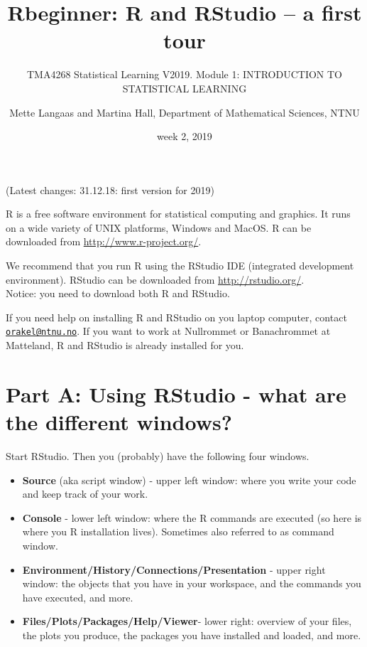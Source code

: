 \documentclass[]{article}
\title{Rbeginner: R and RStudio -- a first tour}
\subtitle{TMA4268 Statistical Learning V2019. Module 1: INTRODUCTION TO
STATISTICAL LEARNING}
\author{Mette Langaas and Martina Hall, Department of Mathematical Sciences,
NTNU}
\date{week 2, 2019}
\providecommand{\tightlist}{%
  \setlength{\itemsep}{0pt}\setlength{\parskip}{0pt}}
\begin{document}
\maketitle

{
\setcounter{tocdepth}{2}
\tableofcontents
}
(Latest changes: 31.12.18: first version for 2019)

R is a free software environment for statistical computing and graphics.
It runs on a wide variety of UNIX platforms, Windows and MacOS. R can be
downloaded from \url{http://www.r-project.org/}.

We recommend that you run R using the RStudio IDE (integrated
development environment). RStudio can be downloaded from
\url{http://rstudio.org/}.\\
Notice: you need to download both R and RStudio.

If you need help on installing R and RStudio on you laptop computer,
contact \href{mailto:orakel@ntnu.no}{\nolinkurl{orakel@ntnu.no}}. If you
want to work at Nullrommet or Banachrommet at Matteland, R and RStudio
is already installed for you.

\section{Part A: Using RStudio - what are the different
windows?}\label{part-a-using-rstudio---what-are-the-different-windows}

Start RStudio. Then you (probably) have the following four windows.

\begin{itemize}
\tightlist
\item
  \textbf{Source} (aka script window) - upper left window: where you
  write your code and keep track of your work.
\item
  \textbf{Console} - lower left window: where the R commands are
  executed (so here is where you R installation lives). Sometimes also
  referred to as command window.\\
\item
  \textbf{Environment/History/Connections/Presentation} - upper right
  window: the objects that you have in your workspace, and the commands
  you have executed, and more.\\
\item
  \textbf{Files/Plots/Packages/Help/Viewer}- lower right: overview of
  your files, the plots you produce, the packages you have installed and
  loaded, and more.
\end{itemize}
\end{document}
